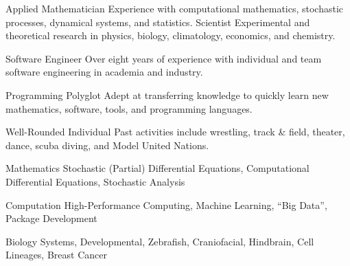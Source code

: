 

\begin{cvskills}

\cvskill
	{Applied Mathematician} %
	{Experience with computational mathematics, stochastic processes, dynamical systems, and statistics.} %
\cvskill
	{Scientist} %
	{Experimental and theoretical research in physics, biology, climatology, economics, and chemistry.} %
	
\cvskill
	{Software Engineer} %
	{Over eight years of experience with individual and team software engineering in academia and industry.} %
	
\cvskill
	{Programming Polyglot} %
	{Adept at transferring knowledge to quickly learn new mathematics, software, tools, and programming languages.} %
	
\cvskill
	{Well-Rounded Individual} %
	{Past activities include wrestling, track \& field, theater, dance, scuba diving, and Model United Nations.} %
\end{cvskills}





\begin{cvskills}

\cvskill
	{Mathematics} %
	{Stochastic (Partial) Differential Equations, Computational Differential Equations, Stochastic Analysis} %
  
\cvskill
	{Computation} %
	{High-Performance Computing, Machine Learning, ``Big Data'', Package Development} %
  
\cvskill
	{Biology} %
	{Systems, Developmental, Zebrafish, Craniofacial, Hindbrain, Cell Lineages, Breast Cancer} %
\end{cvskills}